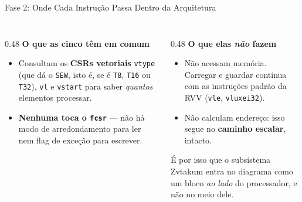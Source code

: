 \documentclass[aspectratio=169,10pt]{beamer}
\begin{document}
\begin{frame}{Fase 2: Onde Cada Instrução Passa Dentro da Arquitetura}
\begin{table}
\begin{tabular}{@{}>{\raggedright\arraybackslash}p{}>{\raggedright\arraybackslash}p{}>{\raggedright\arraybackslash}p{}>{\raggedright\arraybackslash}p{}@{}}
		\end{tabular}
	\end{table}
	\vspace{-0.2em}
	\begin{columns}[T,onlytextwidth]
		\begin{column}{0.48\textwidth}
			\textbf{O que as cinco têm em comum}
			\begin{itemize}
				\item Consultam os \textbf{CSRs vetoriais} \texttt{vtype} (que dá o \texttt{SEW}, isto é, se é \texttt{T8}, \texttt{T16} ou \texttt{T32}), \texttt{vl} e \texttt{vstart} para saber \emph{quantos} elementos processar.
				\item \textbf{Nenhuma toca o \texttt{fcsr}} --- não há modo de arredondamento para ler nem flag de exceção para escrever.
			\end{itemize}
		\end{column}
		\begin{column}{0.48\textwidth}
			\textbf{O que elas \emph{não} fazem}
			\begin{itemize}
				\item Não acessam memória. Carregar e guardar continua com as instruções padrão da RVV (\texttt{vle}, \texttt{vluxei32}).
				\item Não calculam endereço: isso segue no \textbf{caminho escalar}, intacto.
			\end{itemize}
			\vspace{0.2em}
			{\color{black!65}É por isso que o subsistema Zvtakum entra no diagrama como um bloco \emph{ao lado} do processador, e não no meio dele.}
		\end{column}
	\end{columns}
\end{frame}
\end{document}
